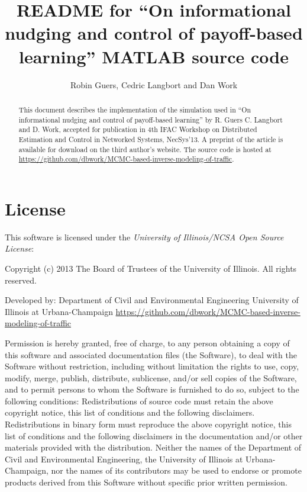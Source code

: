 \documentclass[english]{article}
\begin{document}
\title{README for ``On informational nudging and control of payoff-based learning'' MATLAB source code}


\author{Robin Guers, Cedric Langbort and Dan Work}
\maketitle
\begin{abstract}
This document describes the implementation of the simulation used in ``On informational nudging and control of payoff-based learning'' by R. Guers C. Langbort and D. Work, accepted for publication in 4th IFAC Workshop on Distributed Estimation and Control in Networked Systems, NecSys'13.
A preprint of the article is available for download on the third
author's website. The source code is hosted at \url{https://github.com/dbwork/MCMC-based-inverse-modeling-of-traffic}.
\end{abstract}

\section{License}

This software is licensed under the \emph{University of Illinois/NCSA
Open Source License}:

\begin{center}
Copyright (c) 2013 The Board of Trustees of the University of Illinois.
All rights reserved.
\par\end{center}

\begin{center}
Developed by: Department of Civil and Environmental Engineering University
of Illinois at Urbana-Champaign \url{https://github.com/dbwork/MCMC-based-inverse-modeling-of-traffic}
\par\end{center}

Permission is hereby granted, free of charge, to any person obtaining
a copy of this software and associated documentation files (the \textquotedbl{}Software\textquotedbl{}),
to deal with the Software without restriction, including without limitation
the rights to use, copy, modify, merge, publish, distribute, sublicense,
and/or sell copies of the Software, and to permit persons to whom
the Software is furnished to do so, subject to the following conditions:
Redistributions of source code must retain the above copyright notice,
this list of conditions and the following disclaimers. Redistributions
in binary form must reproduce the above copyright notice, this list
of conditions and the following disclaimers in the documentation and/or
other materials provided with the distribution. Neither the names
of the Department of Civil and Environmental Engineering, the University
of Illinois at Urbana-Champaign, nor the names of its contributors
may be used to endorse or promote products derived from this Software
without specific prior written permission.
\end{document}
